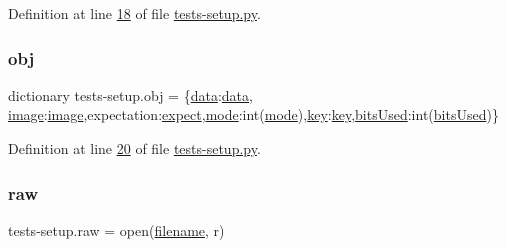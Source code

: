 Definition at line \mbox{\hyperlink{tests-setup_8py_source_l00018}{18}} of file \mbox{\hyperlink{tests-setup_8py_source}{tests-\/setup.\+py}}.

\mbox{\label{namespacetests-setup_afb80c1236926b5468a6d3e942a527a96}} 
\subsubsection{\texorpdfstring{obj}{obj}}
{\footnotesize\ttfamily dictionary tests-\/setup.\+obj = \{\textquotesingle{}\mbox{\hyperlink{namespacetests-setup_a6b4da66e7d24a18856de9023a2dcede4}{data}}\textquotesingle{}\+:\mbox{\hyperlink{namespacetests-setup_a6b4da66e7d24a18856de9023a2dcede4}{data}}, \textquotesingle{}\mbox{\hyperlink{namespacetests-setup_ad55b685280f549e15688a94cbb89f512}{image}}\textquotesingle{}\+:\mbox{\hyperlink{namespacetests-setup_ad55b685280f549e15688a94cbb89f512}{image}},\textquotesingle{}expectation\textquotesingle{}\+:\mbox{\hyperlink{namespacetests-setup_a2c17344dec99b9aaaddaef4438b1f793}{expect}},\textquotesingle{}\mbox{\hyperlink{namespacetests-setup_a04126d10edec6b3171e1b55a00309b23}{mode}}\textquotesingle{}\+:int(\mbox{\hyperlink{namespacetests-setup_a04126d10edec6b3171e1b55a00309b23}{mode}}),\textquotesingle{}\mbox{\hyperlink{namespacetests-setup_a3a21e3298c630c17fc27ca5ab146a8af}{key}}\textquotesingle{}\+:\mbox{\hyperlink{namespacetests-setup_a3a21e3298c630c17fc27ca5ab146a8af}{key}},\textquotesingle{}\mbox{\hyperlink{namespacetests-setup_a64974eb034f518d24195739395783d3d}{bits\+Used}}\textquotesingle{}\+:int(\mbox{\hyperlink{namespacetests-setup_a64974eb034f518d24195739395783d3d}{bits\+Used}})\}}



Definition at line \mbox{\hyperlink{tests-setup_8py_source_l00020}{20}} of file \mbox{\hyperlink{tests-setup_8py_source}{tests-\/setup.\+py}}.

\mbox{\label{namespacetests-setup_a16d40f6dd9430f3bdc79db2d00aab267}} 
\subsubsection{\texorpdfstring{raw}{raw}}
{\footnotesize\ttfamily tests-\/setup.\+raw = open(\mbox{\hyperlink{namespacetests-setup_a1c1b6d4c14026d664106586c65e10a94}{filename}}, \textquotesingle{}r\textquotesingle{})}



